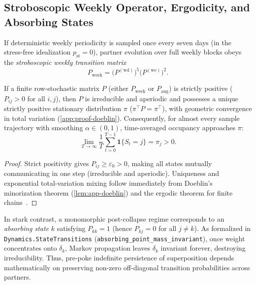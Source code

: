 \subsection{Stroboscopic Weekly Operator, Ergodicity, and Absorbing States}
\label{subsec:dyn-stationary}

If deterministic weekly periodicity is sampled once every seven days (in the stress-free
idealization $p_{\mathrm{st}} = 0$), partner evolution over full weekly blocks obeys the
\emph{stroboscopic weekly transition matrix}
\begin{equation}
  P_{\mathrm{week}} = \bigl(P^{(\mathrm{wd})}\bigr)^5 \bigl(P^{(\mathrm{we})}\bigr)^2.
  \label{eq:weekly-kernel}
\end{equation}

\begin{proposition}
\label{prop:stationary}
If a finite row-stochastic matrix $P$ (either $P_{\mathrm{week}}$ or $P_{\mathrm{aug}}$)
is strictly positive ($P_{ij} > 0$ for all $i, j$), then $P$ is irreducible and aperiodic
and possesses a unique strictly positive stationary distribution $\pi$ ($\pi^\top P = \pi^\top$),
with geometric convergence in total variation (\cref{app:proof-doeblin}). Consequently,
for almost every sample trajectory with smoothing $\alpha \in (0, 1)$, time-averaged
occupancy approaches $\pi$:
\begin{equation}
  \lim_{T \to \infty} \frac{1}{T} \sum_{t=0}^{T-1} \mathbf{1}\{S_t = j\} = \pi_j > 0.
  \label{eq:ergodic-limit}
\end{equation}
\end{proposition}
\begin{proof}
Strict positivity gives $P_{ij} \ge \varepsilon_0 > 0$, making all states mutually
communicating in one step (irreducible and aperiodic). Uniqueness and exponential
total-variation mixing follow immediately from Doeblin's minorization theorem
(\cref{lem:app-doeblin}) and the ergodic theorem for finite chains~\citep{levin2017markov}.
\end{proof}

\noindent\layerformal{} In stark contrast, a monomorphic post-collapse regime corresponds to
an \emph{absorbing state} $k$ satisfying $P_{kk} = 1$ (hence $P_{kj} = 0$ for all $j \neq k$).
As formalized in \texttt{Dynamics.\allowbreak{}StateTransitions} (\texttt{absorbing\_\allowbreak{}point\_mass\_invariant}),
once weight concentrates onto $\delta_k$, Markov propagation leaves $\delta_k$ invariant
forever, destroying irreducibility. Thus, pre-poke indefinite persistence of superposition
depends mathematically on preserving non-zero off-diagonal transition probabilities across
partners.

